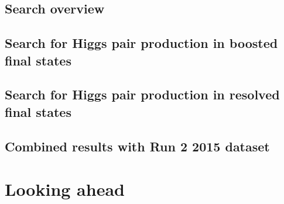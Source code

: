 \documentclass{Dissertate}
\begin{document}
\chapter{Search overview}

\chapter{Search for Higgs pair production in boosted final states}

\chapter{Search for Higgs pair production in resolved final states}

\chapter{Combined results with Run 2 2015 dataset}

\part{Looking ahead}

%    


\clearpage




\end{document}
